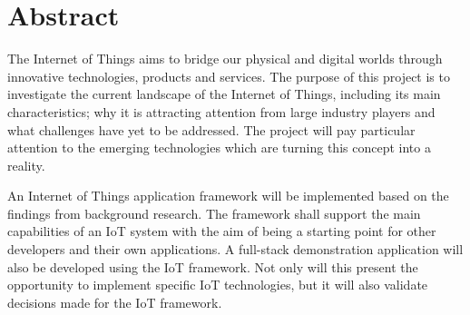 \chapter{Abstract}
  The Internet of Things aims to bridge our physical and digital worlds through innovative technologies, products and services. The purpose of this project is to investigate the current landscape of the Internet of Things, including its main characteristics; why it is attracting attention from large industry players and what challenges have yet to be addressed. The project will pay particular attention to the emerging technologies which are turning this concept into a reality.

  An Internet of Things application framework will be implemented based on the findings from background research. The framework shall support the main capabilities of an IoT system with the aim of being a starting point for other developers and their own applications. A full-stack demonstration application will also be developed using the IoT framework. Not only will this present the opportunity to implement specific IoT technologies, but it will also validate decisions made for the IoT framework.
